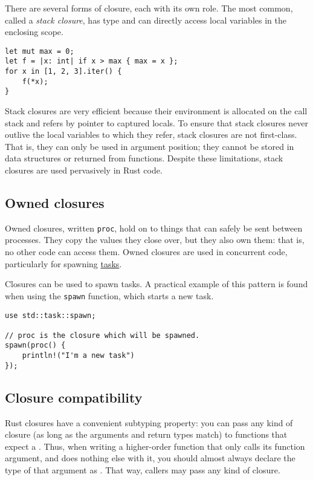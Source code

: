 \documentclass[]{article}
\begin{document}
There are several forms of closure, each with its own role. The most
common, called a \emph{stack closure}, has type
\texttt{\textbar{}\textbar{}} and can directly access local variables in
the enclosing scope.

\begin{verbatim}
let mut max = 0;
let f = |x: int| if x > max { max = x };
for x in [1, 2, 3].iter() {
    f(*x);
}
\end{verbatim}

Stack closures are very efficient because their environment is allocated
on the call stack and refers by pointer to captured locals. To ensure
that stack closures never outlive the local variables to which they
refer, stack closures are not first-class. That is, they can only be
used in argument position; they cannot be stored in data structures or
returned from functions. Despite these limitations, stack closures are
used pervasively in Rust code.

\subsection{Owned closures}\label{owned-closures}

Owned closures, written \texttt{proc}, hold on to things that can safely
be sent between processes. They copy the values they close over, but
they also own them: that is, no other code can access them. Owned
closures are used in concurrent code, particularly for spawning
\href{guide-tasks.html}{tasks}.

Closures can be used to spawn tasks. A practical example of this pattern
is found when using the \texttt{spawn} function, which starts a new
task.

\begin{verbatim}
use std::task::spawn;

// proc is the closure which will be spawned.
spawn(proc() {
    println!("I'm a new task")
});
\end{verbatim}

\subsection{Closure compatibility}\label{closure-compatibility}

Rust closures have a convenient subtyping property: you can pass any
kind of closure (as long as the arguments and return types match) to
functions that expect a \texttt{\textbar{}\textbar{}}. Thus, when
writing a higher-order function that only calls its function argument,
and does nothing else with it, you should almost always declare the type
of that argument as \texttt{\textbar{}\textbar{}}. That way, callers may
pass any kind of closure.
\end{document}
